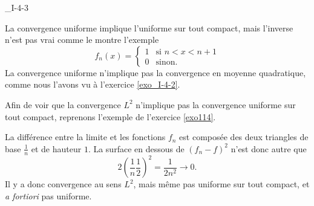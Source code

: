 

\begin{corrige}{_I-4-3}

La convergence uniforme implique l'uniforme sur tout compact, mais l'inverse n'est pas vrai comme le montre l'exemple
\begin{equation}
	f_n(x)=\begin{cases}
	1	&	\text{si }n<x<n+1\\
	0	&	 \text{sinon.}
\end{cases}
\end{equation}
La convergence uniforme n'implique pas la convergence en moyenne quadratique, comme nous l'avons vu à l'exercice \ref{exo_I-4-2}.

Afin de voir que la convergence $L^2$ n'implique pas la convergence uniforme sur tout compact, reprenons l'exemple de l'exercice \ref{exo114}.



La différence entre la limite et les fonctions $f_n$ est composée des deux triangles de base $\frac{1}{ n }$ et de hauteur $1$. La surface en dessous de $(f_n-f)^2$ n'est donc autre que
\begin{equation}
	2\left( \frac{1}{ n }\frac{1}{ 2 } \right)^2=\frac{1}{ 2n^2 }\to 0.
\end{equation}
Il y a donc convergence au sens $L^2$, mais même pas uniforme sur tout compact, et \emph{a fortiori} pas uniforme.

\end{corrige}
